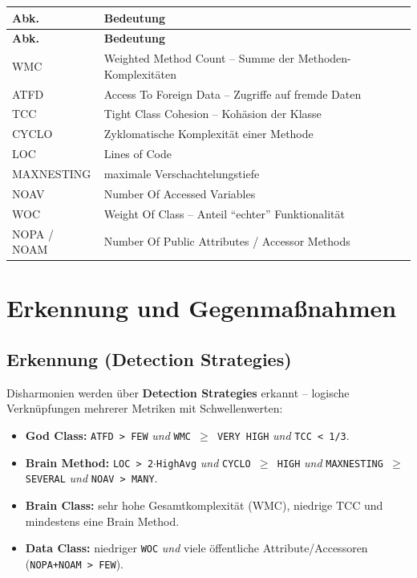 \documentclass[
	fontsize=12pt,          %
	paper=a4,               %
	numbers=noenddot,       %
	listof=totoc,           %
	listof=entryprefix,     %
	listof=nochaptergap,    %
	bibliography=totoc,     %
	parskip=half,           %
	openany                 %
]{scrbook}
\begin{document}
\begin{longtable}{| p{2.2cm} | p{9.0cm} |}
	\hline
	\textbf{Abk.} & \textbf{Bedeutung} \\ \hline
	\endfirsthead
	\hline
	\textbf{Abk.} & \textbf{Bedeutung} \\ \hline
	\endhead
	\hline
	\endfoot
	WMC      & Weighted Method Count -- Summe der Methoden-Komplexitäten \\ \hline
	ATFD     & Access To Foreign Data -- Zugriffe auf fremde Daten \\ \hline
	TCC      & Tight Class Cohesion -- Kohäsion der Klasse \\ \hline
	CYCLO    & Zyklomatische Komplexität einer Methode \\ \hline
	LOC      & Lines of Code \\ \hline
	MAXNESTING & maximale Verschachtelungstiefe \\ \hline
	NOAV     & Number Of Accessed Variables \\ \hline
	WOC      & Weight Of Class -- Anteil ``echter'' Funktionalität \\ \hline
	NOPA / NOAM & Number Of Public Attributes / Accessor Methods \\ \hline
\end{longtable}

\section*{Erkennung und Gegenmaßnahmen}

\subsection*{Erkennung (Detection Strategies)}

Disharmonien werden über \textbf{Detection Strategies} erkannt -- logische
Verknüpfungen mehrerer Metriken mit Schwellenwerten:

\begin{itemize}
	\item \textbf{God Class:} \texttt{ATFD > FEW} \emph{und} \texttt{WMC $\geq$
	      VERY HIGH} \emph{und} \texttt{TCC < 1/3}.
	\item \textbf{Brain Method:} \texttt{LOC > 2$\cdot$HighAvg} \emph{und}
	      \texttt{CYCLO $\geq$ HIGH} \emph{und} \texttt{MAXNESTING $\geq$ SEVERAL}
	      \emph{und} \texttt{NOAV > MANY}.
	\item \textbf{Brain Class:} sehr hohe Gesamtkomplexität (WMC), niedrige TCC
	      und mindestens eine Brain Method.
	\item \textbf{Data Class:} niedriger \texttt{WOC} \emph{und} viele
	      öffentliche Attribute/Accessoren (\texttt{NOPA+NOAM > FEW}).
\end{itemize}
\end{document}
